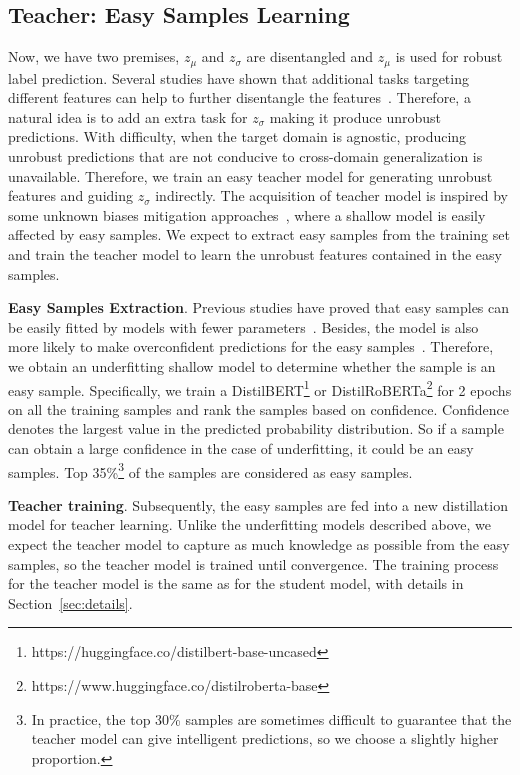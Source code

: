 \documentclass[letterpaper]{article} %
\begin{document}
\subsection{Teacher: Easy Samples Learning}
Now, we have two premises, $z_{\mu}$ and $z_{\sigma}$ are disentangled and $z_{\mu}$ is used for robust label prediction. Several studies have shown that additional tasks targeting different features can help to further disentangle the features~\cite{JohnMBV19, HuangZCWY21}. Therefore, a natural idea is to add an extra task for $z_{\sigma}$ making it produce unrobust predictions. With difficulty, when the target domain is agnostic, producing unrobust predictions that are not conducive to cross-domain generalization is unavailable. Therefore, we train an easy teacher model for generating unrobust features and guiding $z_{\sigma}$ indirectly. The acquisition of teacher model is inspired by some unknown biases mitigation approaches~\cite{UtamaMG20, UtamaMG20b}, where a shallow model is easily affected by easy samples. We expect to extract easy samples from the training set and train the teacher model to learn the unrobust features contained in the easy samples.

\textbf{Easy Samples Extraction}. Previous studies have proved that easy samples can be easily fitted by models with fewer parameters~\cite{LaiZFHZ21}. Besides, the model is also more likely to make overconfident predictions for the easy samples~\cite{DuMJDDGSH21}. Therefore, we obtain an underfitting shallow model to determine whether the sample is an easy sample. Specifically, we train a DistilBERT\footnote{https://huggingface.co/distilbert-base-uncased} or DistilRoBERTa\footnote{https://www.huggingface.co/distilroberta-base} for 2 epochs on all the training samples and rank the samples based on confidence. Confidence denotes the largest value in the predicted probability distribution. So if a sample can obtain a large confidence in the case of underfitting, it could be an easy samples. Top 35\%\footnote{In practice, the top 30\% samples are sometimes difficult to guarantee that the teacher model can give intelligent predictions, so we choose a slightly higher proportion.} of the samples are considered as easy samples.

\textbf{Teacher training}. Subsequently, the easy samples are fed into a new distillation model for teacher learning. Unlike the underfitting models described above, we expect the teacher model to capture as much knowledge as possible from the easy samples, so the teacher model is trained until convergence. The training process for the teacher model is the same as for the student model, with details in Section~\ref{sec:details}.
\end{document}
